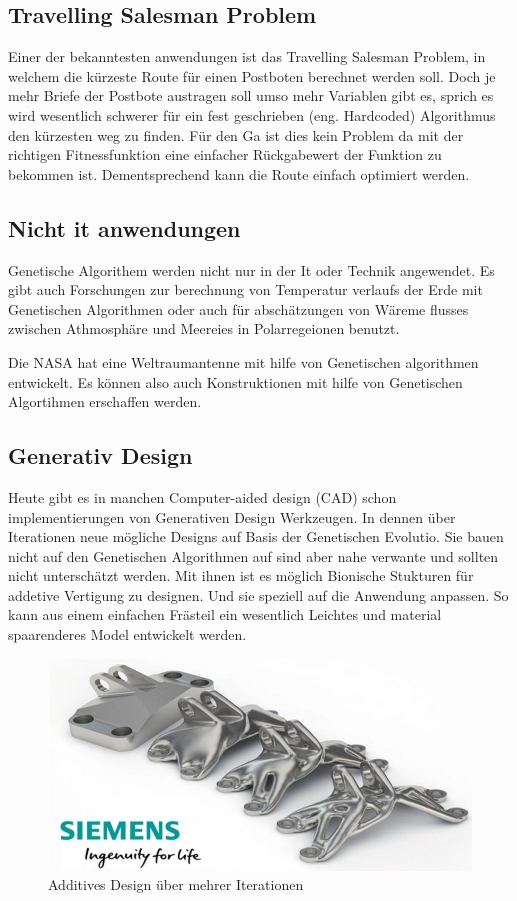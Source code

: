\subsection{Travelling Salesman Problem}
Einer der bekanntesten anwendungen ist das Travelling Salesman Problem, in welchem die kürzeste Route für einen Postboten berechnet werden soll. Doch je mehr Briefe der Postbote austragen soll umso mehr Variablen gibt es, sprich es wird wesentlich schwerer für ein fest geschrieben (eng. Hardcoded) Algorithmus den kürzesten weg zu finden. Für den Ga ist dies kein Problem da mit der richtigen Fitnessfunktion eine einfacher Rückgabewert der Funktion zu bekommen ist. Dementsprechend kann die Route einfach optimiert werden.


\subsection{Nicht it anwendungen}
Genetische Algorithem werden nicht nur in der It oder Technik angewendet. Es gibt auch Forschungen zur berechnung von Temperatur verlaufs der Erde  \cite{Stanislawska1} mit Genetischen Algorithmen oder auch für abschätzungen von Wäreme flusses zwischen Athmosphäre und Meereies in Polarregeionen \cite{Stanislawska2} benutzt. 

Die NASA hat eine Weltraumantenne mit hilfe von Genetischen algorithmen entwickelt. Es können also auch Konstruktionen mit hilfe von Genetischen Algortihmen erschaffen werden.


\subsection{Generativ Design}
Heute gibt es in manchen Computer-aided design (CAD) schon implementierungen von Generativen Design Werkzeugen. In dennen über Iterationen neue mögliche Designs auf Basis der Genetischen Evolutio. Sie bauen nicht auf den Genetischen Algorithmen auf sind aber nahe verwante und sollten nicht unterschätzt werden. 
Mit ihnen ist es möglich Bionische Stukturen für addetive Vertigung zu designen. Und sie speziell auf die Anwendung anpassen. So kann aus einem einfachen Frästeil ein wesentlich Leichtes und material spaarenderes Model entwickelt werden.

\noindent%
\begin{figure}[H]
  \centering  
  \includegraphics[scale=0.3]{img/Additive.png}
  \caption{Additives Design über mehrer Iterationen}
  \label{fig:Ablauf_kurz}
\end{figure}





